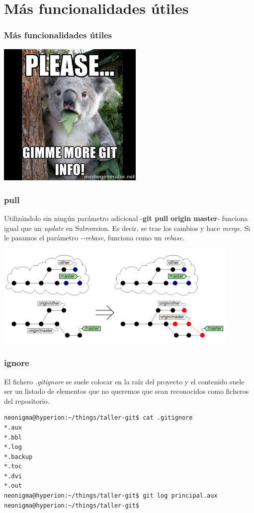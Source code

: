 \section{Más funcionalidades útiles}
\frame
{
\frametitle{Más funcionalidades útiles}
\begin{center}
 \includegraphics[height=7cm]{imgs/koala.jpg} 
\end{center}
}

\frame
{
\frametitle{pull}
Utilizándolo sin ningún parámetro adicional -\textbf{git pull origin master}- funciona igual que un \textit{update} en Subversion. Es decir, se trae los cambios y hace \textit{merge}. Si le pasamos el parámetro \textit{-{}-rebase}, funciona como un \textit{rebase}.

\includegraphics[height=5cm]{imgs/pull.png} 
}

\begin{frame}[fragile]
\frametitle{ignore}
El fichero \textit{.gitignore} se suele colocar en la raíz del proyecto y el contenido suele ser un listado de elementos que no queremos que sean reconocidos como ficheros del repositorio.
\footnotesize
\begin{verbatim}
neonigma@hyperion:~/things/taller-git$ cat .gitignore 
*.aux
*.bbl
*.log
*.backup
*.toc
*.dvi
*.out
neonigma@hyperion:~/things/taller-git$ git log principal.aux
neonigma@hyperion:~/things/taller-git$ 
\end{verbatim}
\end{frame}

